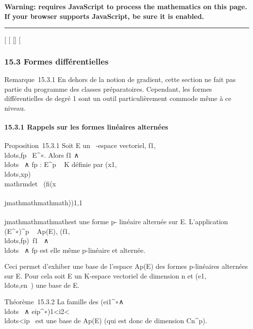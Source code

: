 \textbf{Warning: 
requires JavaScript to process the mathematics on this page.\\ If your
browser supports JavaScript, be sure it is enabled.}

\begin{center}\rule{3in}{0.4pt}\end{center}

{[}
{[}
{[}{]}
{[}

\subsubsection{15.3 Formes différentielles}

Remarque~15.3.1 En dehors de la notion de gradient, cette section ne
fait pas partie du programme des classes préparatoires. Cependant, les
formes différentielles de degré 1 sont un outil particulièrement commode
même à ce niveau.

\paragraph{15.3.1 Rappels sur les formes linéaires alternées}

Proposition~15.3.1 Soit E un ~-espace vectoriel,
f1,\\ldots,fp~
\in E^∗. Alors f1
∧\\ldots~ ∧
fp : E^p \rightarrow~ K définie par
(x1,\\ldots,xp)\mapsto~\\mathrm{det}~
(fi(x\\\\jmathmathmathmath))1\leqi\leqp,1\leq\\\\jmathmathmathmath\leqp est une forme p-
linéaire alternée sur E. L'application (E^∗)^p \rightarrow~
Ap(E),
(f1,\\ldots,fp)\mapsto~f1~
∧\\ldots~ ∧
fp est elle même p-linéaire et alternée.

Ceci permet d'exhiber une base de l'espace Ap(E) des formes
p-linéaires alternées sur E. Pour cela soit E un K-espace vectoriel de
dimension n et
(e1,\\ldots,en~)
une base de E.

Théorème~15.3.2 La famille des
(ei1^∗∧\\ldots~
∧
eip^∗)1\textless{}i2\textless{}\\ldots\textless{}ip\leqn~
est une base de Ap(E) (qui est donc de dimension
Cn^p).

